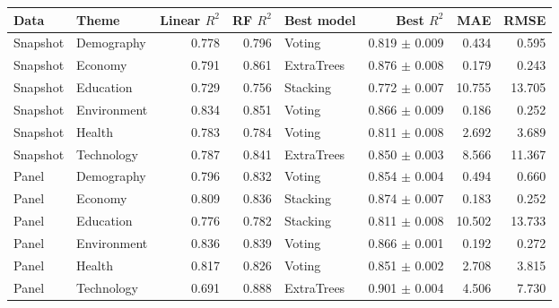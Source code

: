 \footnotesize
\begin{tabular}{llrrlrrr}
\toprule
Data & Theme & Linear $R^2$ & RF $R^2$ & Best model & Best $R^2$ & MAE & RMSE \\
\midrule
Snapshot & Demography & 0.778 & 0.796 & Voting & 0.819 $\pm$ 0.009 & 0.434 & 0.595 \\
Snapshot & Economy & 0.791 & 0.861 & ExtraTrees & 0.876 $\pm$ 0.008 & 0.179 & 0.243 \\
Snapshot & Education & 0.729 & 0.756 & Stacking & 0.772 $\pm$ 0.007 & 10.755 & 13.705 \\
Snapshot & Environment & 0.834 & 0.851 & Voting & 0.866 $\pm$ 0.009 & 0.186 & 0.252 \\
Snapshot & Health & 0.783 & 0.784 & Voting & 0.811 $\pm$ 0.008 & 2.692 & 3.689 \\
Snapshot & Technology & 0.787 & 0.841 & ExtraTrees & 0.850 $\pm$ 0.003 & 8.566 & 11.367 \\
Panel & Demography & 0.796 & 0.832 & Voting & 0.854 $\pm$ 0.004 & 0.494 & 0.660 \\
Panel & Economy & 0.809 & 0.836 & Stacking & 0.874 $\pm$ 0.007 & 0.183 & 0.252 \\
Panel & Education & 0.776 & 0.782 & Stacking & 0.811 $\pm$ 0.008 & 10.502 & 13.733 \\
Panel & Environment & 0.836 & 0.839 & Voting & 0.866 $\pm$ 0.001 & 0.192 & 0.272 \\
Panel & Health & 0.817 & 0.826 & Voting & 0.851 $\pm$ 0.002 & 2.708 & 3.815 \\
Panel & Technology & 0.691 & 0.888 & ExtraTrees & 0.901 $\pm$ 0.004 & 4.506 & 7.730 \\
\bottomrule
\end{tabular}
